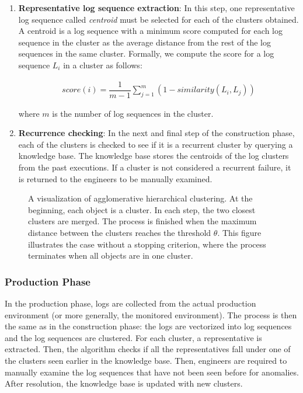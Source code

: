 \begin{enumerate}
    \item \textbf{Representative log sequence extraction}: In this step, one representative log sequence called \textit{centroid} must be selected for each of the clusters obtained. A centroid is a log sequence with a minimum score computed for each log sequence in the cluster as the average distance from the rest of the log sequences in the same cluster. Formally, we compute the score for a log sequence $L_i$ in a cluster as follows:
    
    \begin{align*}
        score(i) = \dfrac{1}{m - 1} \sum_{j = 1}^m (1 - similarity(L_i, L_j))
    \end{align*}
    
    where $m$ is the number of log sequences in the cluster.
    
    \item \textbf{Recurrence checking}: In the next and final step of the construction phase, each of the clusters is checked to see if it is a recurrent cluster by querying a knowledge base. The knowledge base stores the centroids of the log clusters from the past executions. If a cluster is not considered a recurrent failure, it is returned to the engineers to be manually examined.
\end{enumerate}

\begin{figure}\centering
	
	\caption{A visualization of agglomerative hierarchical clustering. At the beginning, each object is a cluster. In each step, the two closest clusters are merged. The process is finished when the maximum distance between the clusters reaches the threshold $\theta$. This figure illustrates the case without a stopping criterion, where the process terminates when all objects are in one cluster.}
	\label{figure:hierarchicalClustering}
\end{figure}


\subsubsection*{Production Phase}
In the production phase, logs are collected from the actual production environment (or more generally, the monitored environment). The process is then the same as in the construction phase: the logs are vectorized into log sequences and the log sequences are clustered. For each cluster, a representative is extracted. Then, the algorithm checks if all the representatives fall under one of the clusters seen earlier in the knowledge base. Then, engineers are required to manually examine the log sequences that have not been seen before for anomalies. After resolution, the knowledge base is updated with new clusters.
 
